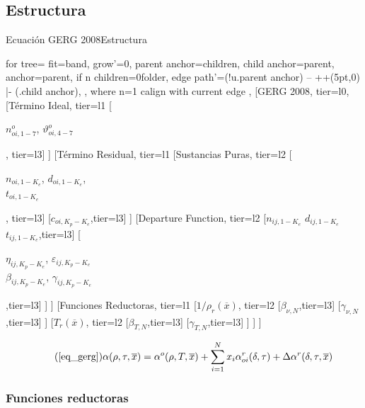 \documentclass[aspectratio=1610,multi,rgb]{beamer}
\begin{document}
\subsection{Estructura}
\begin{frame}[t]{Ecuación GERG 2008}{Estructura}
	{\fontsize{8pt}{8pt}\selectfont
	\begin{forest}
	for tree={
	fit=band,
	grow'=0,
	parent anchor=children,
	child anchor=parent,
	anchor=parent,
	if n children=0{folder}{},
	edge path'={(!u.parent anchor) -- ++(5pt,0) |- (.child anchor)},
	},
	where n=1{
	calign with current edge
	}{},
	[GERG 2008, tier=l0, 
		[Término Ideal, tier=l1
			[\parbox{12em}{
				$n^o_{oi,1-7}$,
				$\vartheta^o_{oi,4-7}$
			},
			tier=l3]
		]
		[Término Residual, tier=l1
			[Sustancias Puras, tier=l2
				[
				\parbox{12em}{
				$n_{oi,1-K_e}$,
				$d_{oi,1-K_e}$,\\
				$t_{oi,1-K_e}$},
				tier=l3]
				[$c_{oi,K_p-K_e}$,tier=l3]
			]
			[Departure Function, tier=l2
				[$n_{ij,1-K_e}$
				$d_{ij,1-K_e}$
				$t_{ij,1-K_e}$,tier=l3]
				[
				\parbox{12em}{$\eta_{ij,K_p-K_e}$,
				$\varepsilon_{ij,K_p-K_e}$ \\
				$\beta_{ij,K_p-K_e}$,
				$\gamma_{ij,K_p-K_e}$}
				,tier=l3]
			]
		]
		[Funciones Reductoras, tier=l1
			[$1/\rho_r(\overline{x})$, tier=l2
				[$\beta_{\nu,N}$,tier=l3]
				[$\gamma_{\nu,N}$,tier=l3]
			]
			[$T_r(\overline{x})$, tier=l2
				[$\beta_{T,N}$,tier=l3]
				[$\gamma_{T,N}$,tier=l3]
			]
			]
	]
	\end{forest}
	}

	\begin{equation}
	\tag{\ref{eq_gerg}}
	\alpha(\rho, \tau, \overline{x}) = 
		\alpha^o(\rho, T, \overline{x})
		+ \sum\limits_{i=1}^N x_i\alpha_{oi}^r(\delta,\tau)
		+ \Delta\alpha^r(\delta,\tau,\overline{x})
	\end{equation}
\end{frame}

\subsubsection{Funciones reductoras}
\end{document}
